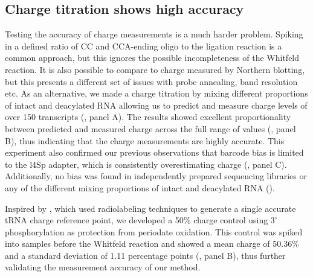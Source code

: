 \documentclass[9pt,lineno]{elife}
\begin{document}
\begin{figure}[ht!]
\label{figsupp:f4S2}
\end{figure}



\subsection{Charge titration shows high accuracy}
Testing the accuracy of charge measurements is a much harder problem.
Spiking in a defined ratio of CC and CCA-ending oligo to the ligation reaction is a common approach, but this ignores the possible incompleteness of the Whitfeld reaction.
It is also possible to compare to charge measured by Northern blotting, but this presents a different set of issues with probe annealing, band resolution etc.
As an alternative, we made a charge titration by mixing different proportions of intact and deacylated RNA allowing us to predict and measure charge levels of over 150 transcripts (, panel A).
The results showed excellent proportionality between predicted and measured charge across the full range of values (, panel B), thus indicating that the charge measurements are highly accurate.
This experiment also confirmed our previous observations that barcode bias is limited to the l4Sp adapter, which is consistently overestimating charge (, panel C).
Additionally, no bias was found in independently prepared sequencing libraries or any of the different mixing proportions of intact and deacylated RNA ().

Inspired by \cite{Evans2017-st}, which used radiolabeling techniques to generate a single accurate tRNA charge reference point, we developed a 50\% charge control using 3’ phosphorylation as protection from periodate oxidation.
This control was spiked into samples before the Whitfeld reaction and showed a mean charge of 50.36\% and a standard deviation of 1.11 percentage points (, panel B), thus further validating the measurement accuracy of our method.
\end{document}
